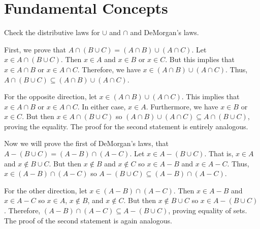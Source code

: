 \documentclass[../../master.tex]{subfiles}
\begin{document}
\section{Fundamental Concepts}

\begin{exercise}
    Check the distributive laws for $\cup$ and $\cap$ and DeMorgan's laws.
\end{exercise}

\begin{solution}
    First, we prove that $A \cap (B \cup C) = (A \cap B) \cup (A \cap C)$. 
    Let $x \in A \cap (B \cup C)$. 
    Then $x \in A$ and $x \in B$ or $x \in C$.
    But this implies that $x \in A \cap B$ or $x \in A \cap C$. 
    Therefore, we have $x \in (A \cap B) \cup (A \cap C)$. 
    Thus, $A \cap (B \cup C) \subseteq (A \cap B) \cup (A \cap C)$.

    For the opposite direction, let $x \in (A \cap B) \cup (A \cap C)$. 
    This implies that $x \in A \cap B$ or $x \in A \cap C$. 
    In either case, $x \in A$. 
    Furthermore, we have $x \in B$ or $x \in C$. 
    But then $x \in A \cap (B \cup C)$ so $(A \cap B) \cup (A \cap C) \subseteq A \cap (B \cup C)$, proving the equality.
    The proof for the second statement is entirely analogous.

    Now we will prove the first of DeMorgan's laws, that $A - (B \cup C) = (A - B) \cap (A - C)$.
    Let $x \in A - (B \cup C)$. 
    That is, $x \in A$ and $x \notin B \cup C$. 
    But then $x \notin B$ and $x \notin C$ so $x \in A - B$ and $x \in A - C$.
    Thus, $x \in (A - B) \cap (A - C)$ so $A - (B \cup C) \subseteq (A - B) \cap (A - C)$.

    For the other direction, let $x \in (A - B) \cap (A - C)$. 
    Then $x \in A - B$ and $x \in A - C$ so $x \in A$, $x \notin B$, and $x \notin C$.
    But then $x \notin B \cup C$ so $x \in A - (B \cup C)$.
    Therefore, $(A - B) \cap (A - C) \subseteq A - (B \cup C)$, proving equality of sets.
    The proof of the second statement is again analogous.
\end{solution}
\end{document}
